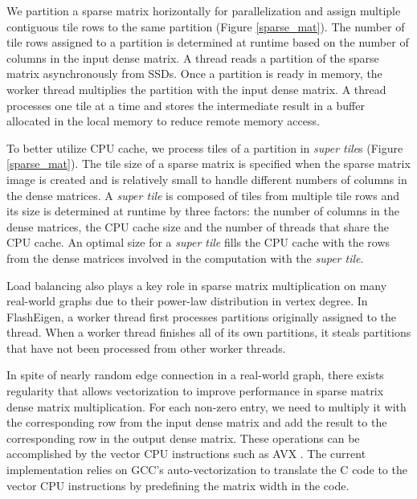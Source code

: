 We partition a sparse matrix horizontally for parallelization and assign multiple
contiguous tile rows to the same partition (Figure \ref{sparse_mat}).
The number of tile rows assigned to a partition is determined at runtime
based on the number of columns in the input dense matrix. A thread reads
a partition of the sparse matrix asynchronously from SSDs. Once a partition
is ready in memory, the worker thread multiplies the partition with the input
dense matrix. A thread processes one tile at a time and stores
the intermediate result in a buffer allocated in the local memory to reduce
remote memory access. %

To better utilize CPU cache, we process tiles of a partition in
\textit{super tile}s (Figure \ref{sparse_mat}). The tile size of a sparse
matrix is specified when the sparse matrix image is created and is relatively
small to handle different numbers of columns in the dense matrices.
A \textit{super tile} is composed of tiles from multiple tile rows and its
size is determined at runtime by three factors: the number of columns
in the dense matrices, the CPU cache size and the number of threads that
share the CPU cache. An optimal size for a \textit{super tile} fills
the CPU cache with the rows from the dense matrices involved in
the computation with the \textit{super tile}.

Load balancing also plays a key role in sparse matrix multiplication on
many real-world graphs due to their power-law distribution in vertex degree.
In FlashEigen, a worker thread first processes partitions originally assigned
to the thread. When a worker thread finishes
all of its own partitions, it steals partitions that have not been processed
from other worker threads.

In spite of nearly random edge connection in a real-world graph,
there exists regularity that allows vectorization to improve performance
in sparse matrix dense matrix multiplication. For each non-zero entry, we
need to multiply it with the corresponding row from the input dense matrix
and add the result to the corresponding row in the output dense matrix.
These operations can be accomplished by the vector CPU instructions such as
AVX \cite{avx}. The current implementation relies on GCC's auto-vectorization
to translate the C code to the vector CPU instructions by predefining the matrix
width in the code.

